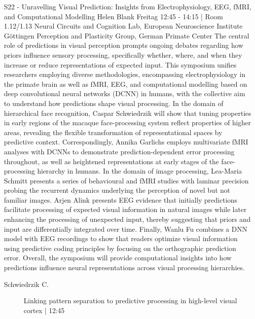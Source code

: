 
            \begin{symposium}
            {S22 - Unravelling Visual Prediction: Insights from Electrophysiology, EEG, fMRI, and Computational Modelling}
            {Helen Blank}
            {Freitag 12:45 - 14:15 | Room 1.12/1.13}
            {Neural Circuits and Cognition Lab, European Neuroscience Institute Göttingen Perception and Plasticity Group, German Primate Center}
            The central role of predictions in visual perception prompts ongoing debates regarding how priors influence sensory processing, specifically whether, where, and when they increase or reduce representations of expected input. This symposium unifies researchers employing diverse methodologies, encompassing electrophysiology in the primate brain as well as fMRI, EEG, and computational modelling based on deep convolutional neural networks (DCNN) in humans, with the collective aim to understand how predictions shape visual processing.
In the domain of hierarchical face recognition, Caspar Schwiedrzik will show that tuning properties in early regions of the macaque face-processing system reflect properties of higher areas, revealing the flexible transformation of representational spaces by predictive context. Correspondingly, Annika Garlichs employs multivariate fMRI analyses with DCNNs to demonstrate prediction-dependent error processing throughout, as well as heightened representations at early stages of the face-processing hierarchy in humans. In the domain of image processing, Lea-Maria Schmitt presents a series of behavioural and fMRI studies with laminar precision probing the recurrent dynamics underlying the perception of novel but not familiar images. Arjen Alink presents EEG evidence that initially predictions facilitate processing of expected visual information in natural images while later enhancing the processing of unexpected input, thereby suggesting that priors and input are differentially integrated over time. Finally, Wanlu Fu combines a DNN model with EEG recordings to show that readers optimize visual information using predictive coding principles by focusing on the orthographic prediction error. Overall, the symposium will provide computational insights into how predictions influence neural representations across visual processing hierarchies.
            \begin{description}    
            
                \item [ Schwiedrzik C.] Linking pattern separation to predictive processing in high-level visual cortex  \textcolor{mygray}{ | 12:45}    
                

\end{description}
\end{symposium}
